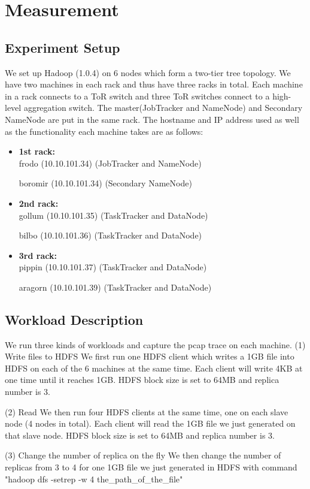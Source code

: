 \section{Measurement}
\label{section:measurement}


\subsection{\bf Experiment Setup}
We set up Hadoop (1.0.4) on 6 nodes which form a two-tier tree topology. We have two machines in each rack and thus have three racks in total. Each machine in a rack connects to a ToR switch and three ToR switches connect to a high-level aggregation switch. The master(JobTracker and NameNode) and Secondary NameNode are put in the same rack. The hostname and IP address used as well as the functionality each machine takes are as follows:
\begin{itemize}
\item {\bf 1st rack:}
\\
frodo (10.10.101.34) (JobTracker and NameNode)

boromir (10.10.101.34) (Secondary NameNode)

\item {\bf 2nd rack:}
\\
gollum (10.10.101.35) (TaskTracker and DataNode)

bilbo (10.10.101.36)	(TaskTracker and DataNode)

\item {\bf 3rd rack:}
\\
pippin (10.10.101.37)	(TaskTracker and DataNode)

aragorn (10.10.101.39)	(TaskTracker and DataNode)
\end{itemize}

\subsection{\bf Workload Description}
We run three kinds of workloads and capture the pcap trace on each machine.
(1) Write files to HDFS
We first run one HDFS client which writes a 1GB file into HDFS on each of the 6 machines at the same time. Each client will write 4KB at one time until it reaches 1GB. HDFS block size is set to 64MB and replica number is 3.

(2) Read
We then run four HDFS clients at the same time, one on each slave node (4 nodes in total). Each client will read the 1GB file we just generated on that slave node. HDFS block size is set to 64MB and replica number is 3.

(3) Change the number of replica on the fly
We then change the number of replicas from 3 to 4 for one 1GB file we just generated in HDFS with command "hadoop dfs -setrep -w 4 the\_path\_of\_the\_file"



